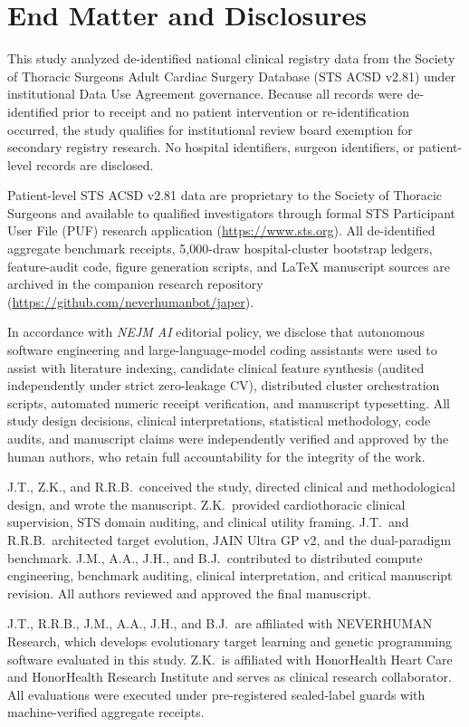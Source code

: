 \section{End Matter and Disclosures}
\label{sec:disclosures}

This study analyzed de-identified national clinical registry data from the Society of Thoracic Surgeons Adult Cardiac Surgery Database (STS ACSD v2.81) under institutional Data Use Agreement governance. Because all records were de-identified prior to receipt and no patient intervention or re-identification occurred, the study qualifies for institutional review board exemption for secondary registry research. No hospital identifiers, surgeon identifiers, or patient-level records are disclosed.

Patient-level STS ACSD v2.81 data are proprietary to the Society of Thoracic Surgeons and available to qualified investigators through formal STS Participant User File (PUF) research application (\url{https://www.sts.org}). All de-identified aggregate benchmark receipts, 5,000-draw hospital-cluster bootstrap ledgers, feature-audit code, figure generation scripts, and LaTeX manuscript sources are archived in the companion research repository (\url{https://github.com/neverhumanbot/japer}).

In accordance with \emph{NEJM AI} editorial policy, we disclose that autonomous software engineering and large-language-model coding assistants were used to assist with literature indexing, candidate clinical feature synthesis (audited independently under strict zero-leakage CV), distributed cluster orchestration scripts, automated numeric receipt verification, and manuscript typesetting. All study design decisions, clinical interpretations, statistical methodology, code audits, and manuscript claims were independently verified and approved by the human authors, who retain full accountability for the integrity of the work.

J.T., Z.K., and R.R.B.\ conceived the study, directed clinical and methodological design, and wrote the manuscript. Z.K.\ provided cardiothoracic clinical supervision, STS domain auditing, and clinical utility framing. J.T.\ and R.R.B.\ architected target evolution, JAIN Ultra GP v2, and the dual-paradigm benchmark. J.M., A.A., J.H., and B.J.\ contributed to distributed compute engineering, benchmark auditing, clinical interpretation, and critical manuscript revision. All authors reviewed and approved the final manuscript.

J.T., R.R.B., J.M., A.A., J.H., and B.J.\ are affiliated with NEVERHUMAN Research, which develops evolutionary target learning and genetic programming software evaluated in this study. Z.K.\ is affiliated with HonorHealth Heart Care and HonorHealth Research Institute and serves as clinical research collaborator. All evaluations were executed under pre-registered sealed-label guards with machine-verified aggregate receipts.
